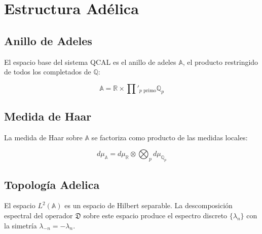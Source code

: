 \chapter{Estructura Adélica}

\section{Anillo de Adeles}

El espacio base del sistema QCAL es el anillo de adeles $\mathbb{A}$,
el producto restringido de todos los completados de $\mathbb{Q}$:

\[
\mathbb{A} = \mathbb{R} \times \prod'_{p \text{ primo}} \mathbb{Q}_p
\]

\section{Medida de Haar}

La medida de Haar sobre $\mathbb{A}$ se factoriza como producto de
las medidas locales:

\[
d\mu_{\mathbb{A}} = d\mu_{\mathbb{R}} \otimes \bigotimes_{p} d\mu_{\mathbb{Q}_p}
\]

\section{Topología Adelica}

El espacio $L^2(\mathbb{A})$ es un espacio de Hilbert separable.
La descomposición espectral del operador $\mathfrak{D}$ sobre este
espacio produce el espectro discreto $\{ \lambda_n \}$ con la
simetría $\lambda_{-n} = -\lambda_n$.
